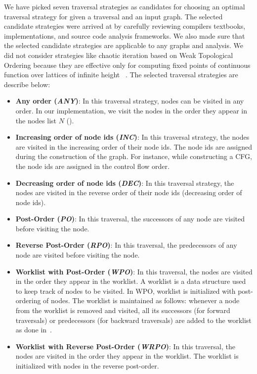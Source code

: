 We have picked seven traversal strategies as candidates for choosing an optimal
traversal strategy for given a traversal and an input graph. The selected candidate strategies were arrived at by carefully reviewing compilers textbooks, implementations, and source code analysis frameworks. We also made sure that the selected candidate strategies are applicable to any graphs and analysis. We did not consider strategies like chaotic iteration based on Weak Topological Ordering because they are effective only for computing fixed points of continuous function over lattices of infinite height ~\cite{bourdoncle93}.
The selected traversal strategies are describe below:
\begin{itemize}
  \item \textbf{Any order (\textit{ANY})}: In this traversal strategy, nodes can
  be visited in any order. In our implementation, we visit the nodes in the
  order they appear in the nodes list $N$ ().
  \item \textbf{Increasing order of node ids (\textit{INC})}: In this traversal
  strategy, the nodes are visited in the increasing order of their node ids. The
  node ids are assigned during the construction of the graph. For instance, while
  constructing a CFG, the node ids are assigned in the control flow order. 
%   
  \item \textbf{Decreasing order of node ids (\textit{DEC})}: In this traversal
  strategy, the nodes are visited in the reverse order of their node ids
  (decreasing order of node ids).
  \item \textbf{Post-Order (\textit{PO})}: In this traversal, the successors of
  any node are visited before visiting the node.
  \item \textbf{Reverse Post-Order (\textit{RPO})}: In this traversal, the
  predecessors of any node are visited before visiting the node.
  \item \textbf{Worklist with Post-Order (\textit{WPO})}: In this traversal, the
  nodes are visited in the order they appear in the worklist. A worklist is a
  data structure used to keep track of nodes to be visited. In WPO, worklist is
  initialized with post-ordering of nodes. The worklist is maintained as
  follows: whenever a node from the worklist is removed and visited, all its
  successors (for forward traversals) or predecessors (for backward traversals)
  are added to the worklist as done in~\cite{atkinson2001implementation}.
  \item \textbf{Worklist with Reverse Post-Order (\textit{WRPO})}: In this
  traversal, the nodes are visited in the order they appear in the worklist. The
  worklist is initialized with nodes in the reverse post-order.
\end{itemize}

